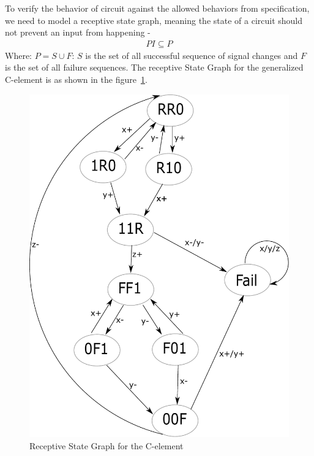 \documentclass[10pt,journal,compsoc]{IEEEtran}
\begin{document}
To verify the behavior of circuit against the allowed behaviors from specification, we need to model a receptive state graph, meaning the state of a circuit should not prevent an 
input from happening -
\begin{align*}
PI\subseteq P
\end{align*}
Where: $P=S\cup F$: $S$ is the set of all successful sequence of signal changes and $F$ is the set of all failure sequences.
The receptive State Graph for the generalized C-element is as shown in the figure~\ref{celem_sg}. 

\begin{figure}[hbt]
  \begin{center}
  \includegraphics[scale = 0.45]{celem_sg}
  \end{center}
  \vspace{-2ex}
  \caption{Receptive State Graph for the C-element}
  \label{celem_sg}
  \vspace{-1ex}
\end{figure}
\end{document}
